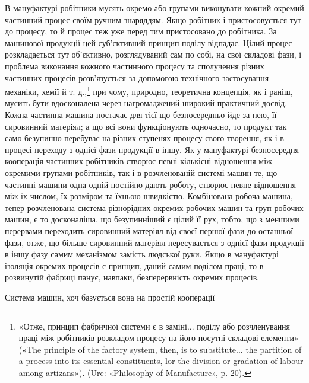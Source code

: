 В мануфактурі робітники мусять окремо або групами виконувати
кожний окремий частинний процес своїм ручним знаряддям.
Якщо робітник і пристосовується тут до процесу, то й процес
теж уже перед тим пристосовано до робітника. За машинової
продукції цей суб’єктивний принцип поділу відпадає. Цілий
процес розкладається тут об’єктивно, розглядуваний сам по собі,
на свої складові фази, і проблема виконання кожного частинного
процесу та сполучення різних частинних процесів розв’язується
за допомогою технічного застосування механіки, хемії й т. д.,\footnote{
«Отже, принцип фабричної системи є в заміні... поділу або розчленування
праці між робітників розкладом процесу на його посутні
складові елементи» («The principle of the factory system, then, is to substitute...
the partition of a process into its essential constituents, lor the
division or gradation of labour among artizans»). (Ure: «Philosophy of
Manufacture», p. 20).
}
при чому, природно, теоретична концепція, як і раніш, мусить
бути вдосконалена через нагромаджений широкий практичний
досвід. Кожна частинна машина постачає для тієї що безпосередньо
йде за нею, її сировинний матеріял; а що всі вони функціонують
одночасно, то продукт так само безупинно перебуває на
різних ступенях процесу свого творення, як і в процесі переходу
з однієї фази продукції в іншу. Як у мануфактурі безпосередня
кооперація частинних робітників створює певні кількісні відношення
між окремими групами робітників, так і в розчленованій
системі машин те, що частинні машини одна одній постійно дають
роботу, створює певне відношення між їх числом, їх розміром
та їхньою швидкістю. Комбінована робоча машина, тепер розчленована
система різнорідних окремих робочих машин та груп
робочих машин, є то досконаліша, що безупинніший є цілий її
рух, тобто, що з меншими перервами переходить сировинний матеріял
від своєї першої фази до останньої фази, отже, що більше
сировинний матеріял пересувається з однієї фази продукції в
іншу фазу самим механізмом замість людської руки. Якщо в
мануфактурі ізоляція окремих процесів є принцип, даний самим
поділом праці, то в розвинутій фабриці панує, навпаки, безперервність
окремих процесів.

Система машин, хоч базується вона на простій кооперації

